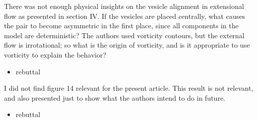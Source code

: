 \documentclass[11pt]{article}
\newcommand{\comment}[1]{{\color{blue} #1}}
\begin{document}
\noindent
\comment{There was not enough physical insights on the vesicle alignment
in extensional flow as presented in section IV. If the vesicles are
placed centrally, what causes the pair to become asymmetric in the first
place, since all components in the model are deterministic? The authors
used vorticity contours, but the external flow is irrotational; so what
is the origin of vorticity, and is it appropriate to use vorticity to
explain the behavior?}
\begin{itemize}
  \item rebuttal
\end{itemize}

\noindent
\comment{I did not find figure 14 relevant for the present article. This
result is not relevant, and also presented just to show what the authors
intend to do in future.}
\begin{itemize}
  \item rebuttal
\end{itemize}
\end{document}
